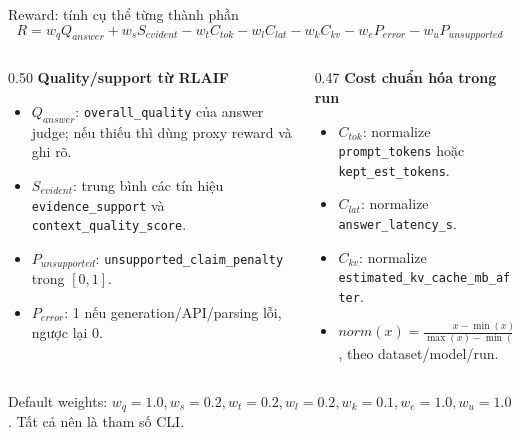 \documentclass[aspectratio=169,10pt]{beamer}
\newcommand{\smallcode}[1]{\texttt{\scriptsize #1}}
\newcommand{\minihead}[1]{{\bfseries\color{AccentDark}#1}}
\newcommand{\takeaway}[1]{%
  \vspace{0.46em}
  \noindent\colorbox{Soft}{%
    \parbox{\dimexpr\linewidth-2\fboxsep}{\color{Ink}\strut #1\strut}%
  }%
}
\newenvironment{tightitemize}{\begin{itemize}\setlength{\itemsep}{0.22em}\setlength{\parskip}{0pt}}{\end{itemize}}
\begin{document}
\begin{frame}{Reward: tính cụ thể từng thành phần}
  \footnotesize
  \[
    R = w_q Q_{answer} + w_s S_{evident}
    - w_t C_{tok} - w_l C_{lat}
    - w_k C_{kv} - w_e P_{error} - w_u P_{unsupported}
  \]

  \vspace{-0.1cm}
  \begin{columns}[T,onlytextwidth]
    \begin{column}{0.50\textwidth}
      \minihead{Quality/support từ RLAIF}\\[-0.1cm]
      \begin{tightitemize}
        \item \(Q_{answer}\): \smallcode{overall\_quality} của answer judge; nếu thiếu thì dùng proxy reward và ghi rõ.
        \item \(S_{evident}\): trung bình các tín hiệu \smallcode{evidence\_support} và \smallcode{context\_quality\_score}.
        \item \(P_{unsupported}\): \smallcode{unsupported\_claim\_penalty} trong \([0,1]\).
        \item \(P_{error}\): 1 nếu generation/API/parsing lỗi, ngược lại 0.
      \end{tightitemize}
    \end{column}
    \begin{column}{0.47\textwidth}
      \minihead{Cost chuẩn hóa trong run}\\[-0.1cm]
      \begin{tightitemize}
        \item \(C_{tok}\): normalize \smallcode{prompt\_tokens} hoặc \smallcode{kept\_est\_tokens}.
        \item \(C_{lat}\): normalize \smallcode{answer\_latency\_s}.
        \item \(C_{kv}\): normalize \smallcode{estimated\_kv\_cache\_mb\_after}.
        \item \(norm(x)=\frac{x-\min(x)}{\max(x)-\min(x)+\epsilon}\), theo dataset/model/run.
      \end{tightitemize}
    \end{column}
  \end{columns}
  \takeaway{\scriptsize Default weights: \(w_q=1.0,w_s=0.2,w_t=0.2,w_l=0.2,w_k=0.1,w_e=1.0,w_u=1.0\). Tất cả nên là tham số CLI.}
\end{frame}
\end{document}
